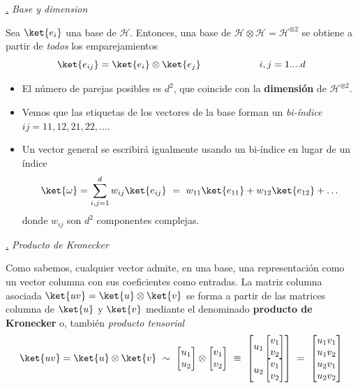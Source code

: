 \documentclass[a4paper,11pt]{book} %
\numberwithin{equation}{chapter}
\def\subsubiContadorIt{\par\addtocounter{subsubsection}{1}\underline{\it\thesubsubsection.}\hskip0.5cm \setcounter{subsubsubsectionIt}{0}}
\newcommand{\SubsubiIt}[1]{
		\subsubiContadorIt \textit{#1}
	}
\newcounter{subsubsubsectionIt}[subsubsection]
\begin{document}
			\SubsubiIt{Base y dimension}

	\begin{mybox_gray2}{}
	Sea $\ket{e_i}$ una base de $\mathcal{H}$. Entonces, una base de $\mathcal{H}\otimes \mathcal{H}=\mathcal{H}^{\otimes 2}$ se obtiene
a partir de \textit{todos} los emparejamientos 
	\begin{equation}
\ket{e_{ij}} = \ket{e_i}\otimes \ket{e_j}~~~~~~~~~~~~~~~~~~ i,j=1....d
	\end{equation}
	\end{mybox_gray2}
\begin{itemize}
	\item El número de parejas posibles es $d^2$, que coincide con la \textbf{dimensión} de $\mathcal{H}^{\otimes 2}$.
	\item Vemos que las etiquetas de los vectores de la base forman un \textit{bi-índice} $ij=11,12,21,22,...$.
	\item Un vector general se escribirá igualmente usando un bi-índice en lugar de un índice
 	\begin{equation}
\ket{\omega} = \sum_{i,j=1}^{d} w_{ij} \ket{e_{ij}} ~=~
 	w_{11}\ket{e_{11}} + w_{12}\ket{e_{12}} +\ldots
 	\end{equation}
donde $w_{ij}$ son $d^2$ componentes complejas.
\end{itemize}



			\SubsubiIt{Producto de Kronecker}

Como sabemos, cualquier vector admite, en una base, una representación como un vector columna con sus coeficientes como entradas. La matriz columna asociada $\ket{uv}= \ket{u}\otimes \ket{v}$ se forma a partir de las matrices columna de $\ket{u}$ y $\ket{v}$ mediante el denominado \textbf{producto de Kronecker} o, también \textit{producto tensorial}
	\begin{equation}
	 \ket{uv} = \ket{u}\otimes \ket{v} ~\sim~ 
\begin{bmatrix}u_1\\ u_2 \end{bmatrix}\otimes \begin{bmatrix}v_1\\ v_2 \end{bmatrix} ~\equiv ~
\begin{bmatrix}u_1 \begin{bmatrix}v_1\\ v_2 \end{bmatrix} \\ u_2 \begin{bmatrix}v_1\\ v_2 \end{bmatrix}  \end{bmatrix}
~=~\begin{bmatrix}u_1v_1\\ u_1v_2 \\ u_2 v_1 \\ u_2 v_2  \end{bmatrix}
	\end{equation}
\end{document}
